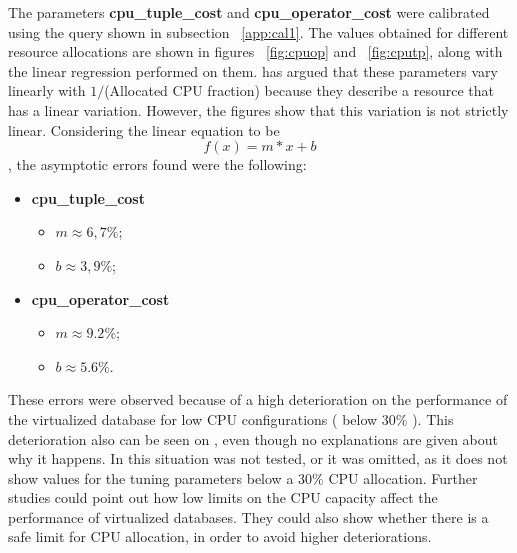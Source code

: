 \documentclass[jidm,a4paper]{jidm} %
\begin{document}
The parameters \textbf{cpu\_tuple\_cost} and \textbf{cpu\_operator\_cost} were calibrated using the query shown in subsection ~\ref{app:cal1}. The values obtained for different resource allocations are shown in figures ~\ref{fig:cpuop} and ~\ref{fig:cputp}, along with the linear regression performed on them. \cite{Soror:2008:AVM:1376616.1376711} has argued that these parameters vary linearly with $1/$(Allocated CPU fraction) because they describe a resource that has a linear variation. However, the figures show that this variation is not strictly linear. Considering the linear equation to be
\[
 f(x) = m*x + b
\],
the asymptotic errors found were the following:
\begin{itemize}
 \item \textbf{cpu\_tuple\_cost}
 \begin{itemize}
  \item $m \approx 6,7\% $;
  \item $b \approx 3,9\% $;
 \end{itemize}
  \item \textbf{cpu\_operator\_cost}
 \begin{itemize}
  \item $m \approx 9.2\% $;
  \item $b \approx 5.6\% $.
 \end{itemize}
\end{itemize}

These errors were observed because of a high deterioration on the performance of the virtualized database for low CPU configurations ( below $30\%$ ). This deterioration also can be seen on \cite{4401021}, even though no explanations are given about why it happens. In \cite{Soror:2008:AVM:1376616.1376711} this situation was not tested, or it was omitted, as it does not show values for the tuning parameters below  a $30\%$ CPU allocation. Further studies could point out how low limits on the CPU capacity affect the performance of virtualized databases. They could also show whether there is a safe limit for CPU allocation, in order to avoid higher deteriorations. 
\end{document}
